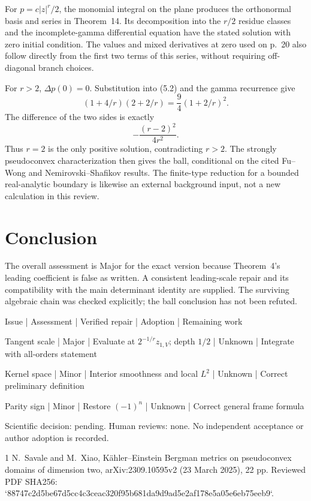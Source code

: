 \documentclass[10pt]{article}
\begin{document}
For \(p=c|z|^r/2\), the monomial integral on the plane produces the orthonormal basis and series in Theorem 14. Its decomposition into the \(r/2\) residue classes and the incomplete-gamma differential equation have the stated solution with zero initial condition. The values and mixed derivatives at zero used on p. 20 also follow directly from the first two terms of this series, without requiring off-diagonal branch choices.\par
For \(r>2\), \(\Delta p(0)=0\). Substitution into (5.2) and the gamma recurrence give \[(1+4/r)(2+2/r)=\frac94(1+2/r)^2 .\] The difference of the two sides is exactly \[-\frac{(r-2)^2}{4r^2}.\] Thus \(r=2\) is the only positive solution, contradicting \(r>2\). The strongly pseudoconvex characterization then gives the ball, conditional on the cited Fu–Wong and Nemirovski–Shafikov results. The finite-type reduction for a bounded real-analytic boundary is likewise an external background input, not a new calculation in this review.\par
\section*{Conclusion}
The overall assessment is Major for the exact version because Theorem 4’s leading coefficient is false as written. A consistent leading-scale repair and its compatibility with the main determinant identity are supplied. The surviving algebraic chain was checked explicitly; the ball conclusion has not been refuted.\par
Issue | Assessment | Verified repair | Adoption | Remaining work\par
Tangent scale | Major | Evaluate at \(2^{-1/r}z_{1,V}\); depth \(1/2\) | Unknown | Integrate with all-orders statement\par
Kernel space | Minor | Interior smoothness and local \(L^2\) | Unknown | Correct preliminary definition\par
Parity sign | Minor | Restore \((-1)^n\) | Unknown | Correct general frame formula\par
Scientific decision: pending. Human reviews: none. No independent acceptance or author adoption is recorded.\par
1 N. Savale and M. Xiao, Kähler–Einstein Bergman metrics on pseudoconvex domains of dimension two, arXiv:2309.10595v2 (23 March 2025), 22 pp. Reviewed PDF SHA256: `88747c2d5be67d5cc4c3ceac320f95b681da9d9ad5e2af178e5a05e6eb75eeb9`.\par
\end{document}

